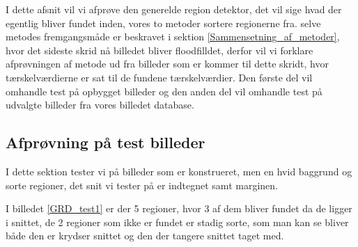{\sffamily
I dette afsnit vil vi afprøve den generelde region detektor, det vil
sige hvad der egentlig bliver fundet inden, vores to metoder sortere
regionerne fra. selve metodes fremgangsmåde er beskravet i sektion
\ref{Sammensetning_af_metoder}, hvor det sideste skrid nå billedet
bliver floodfilldet, derfor vil vi forklare afprøvningen af metode ud
fra billeder som er kommer til dette skridt, hvor tærskelværdierne er
sat til de fundene tærskelværdier. Den første del vil omhandle test på
opbygget billeder og den anden del vil omhandle test på udvalgte
billeder fra vores billedet database.
}

\subsection{Afprøvning på test billeder}
I dette sektion tester vi på billeder som er konstrueret, men en hvid
baggrund og sorte regioner, det snit vi tester på er indtegnet samt
marginen. 

I billedet \ref{GRD_test1} er der 5 regioner, hvor 3 af dem bliver
fundet da de ligger i snittet, de 2 regioner som ikke er fundet er
stadig sorte, som man kan se bliver både den er krydser snittet og den
der tangere snittet taget med. 

\begin{figure}[!h]
    \centering
		\hspace{1em}
    	\hspace{1em}
        \caption[]{}
     \label{GRD_test1_sammen}
\end{figure}

